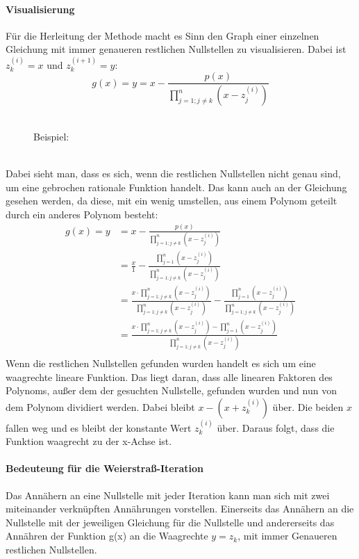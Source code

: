 \documentclass[12pt]{article}
\begin{document}
\paragraph{Visualisierung}
Für die Herleitung der Methode macht es Sinn den Graph einer einzelnen Gleichung mit immer genaueren restlichen Nullstellen zu visualisieren. Dabei ist $z_k^{(i)} = x$ und $z_k^{(i+1)} = y$:
\begin{equation}
    g(x) = y = x - \frac{p(x)}{\prod_{j=1;j\neq k}^{n} (x-z_j^{(i)})}
\end{equation}\\
\begin{figure}[h]
    \centering
    \caption{Beispiel:}
\end{figure}\\
Dabei sieht man, dass es sich, wenn die restlichen Nullstellen nicht genau sind, um eine gebrochen rationale Funktion handelt. Das kann auch an der Gleichung gesehen werden, da diese, mit ein wenig umstellen, aus einem Polynom geteilt durch ein anderes Polynom besteht:
\begin{align*}
    g(x) = y &= x - \frac{p(x)}{\prod_{j=1;j\neq k}^{n} (x-z_j^{(i)})} \\
    &= \frac{x}{1} - \frac{\prod_{j=1}^{n} (x-z_j^{(i)})}{\prod_{j=1;j\neq k}^{n} (x-z_j^{(i)})} \\
    &= \frac{x \cdot \prod_{j=1;j\neq k}^{n} (x-z_j^{(i)})}{\prod_{j=1;j\neq k}^{n} (x-z_j^{(i)})} - \frac{\prod_{j=1}^{n} (x-z_j^{(i)})}{\prod_{j=1;j\neq k}^{n} (x-z_j^{(i)})} \\
    &= \frac{x \cdot \prod_{j=1;j\neq k}^{n} (x-z_j^{(i)}) - \prod_{j=1}^{n} (x-z_j^{(i)})}{\prod_{j=1;j\neq k}^{n} (x-z_j^{(i)})} \\
\end{align*}
Wenn die restlichen Nullstellen gefunden wurden handelt es sich um eine waagrechte lineare Funktion. Das liegt daran, dass alle linearen Faktoren des Polynoms, außer dem der gesuchten Nullstelle, gefunden wurden und nun von dem Polynom dividiert werden. Dabei bleibt $x-(x+z_k^{(i)})$ über. Die beiden $x$ fallen weg und es bleibt der konstante Wert $z_k^{(i)}$ über. Daraus folgt, dass die Funktion waagrecht zu der x-Achse ist.
\paragraph{Bedeuteung für die Weierstraß-Iteration}
Das Annähern an eine Nullstelle mit jeder Iteration kann man sich mit zwei miteinander verknüpften Annährungen vorstellen. Einerseits das Annähern an die Nullstelle mit der jeweiligen Gleichung für die Nullstelle und andererseits das Annähren der Funktion g(x) an die Waagrechte $y=z_k$, mit immer Genaueren restlichen Nullstellen.
\end{document}
